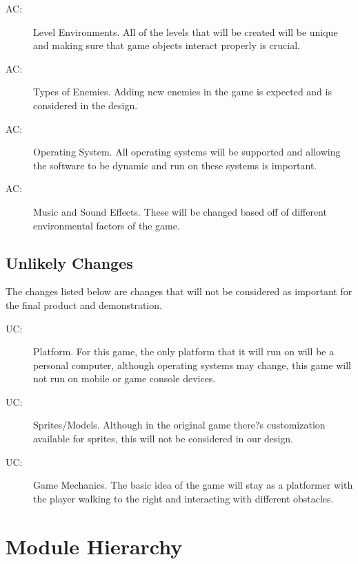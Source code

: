 \documentclass[12pt, titlepage]{article}
\newcounter{acnum}
\newcommand{\actheacnum}{AC\theacnum}
\newcounter{ucnum}
\newcommand{\uctheucnum}{UC\theucnum}
\begin{document}
\begin{description}
\item[ \actheacnum \label{acEnvironments}:] Level Environments. All of the levels that will be created will be unique and making sure that game objects interact properly is crucial.
\item[ \actheacnum \label{acEnemiest}:] Types of Enemies. Adding new enemies in the game is expected and is considered in the design.
\item [ \actheacnum \label{acOperatingSys}:] Operating System. All operating systems will be supported and allowing the software to be dynamic and run on these systems is important.
\item [ \actheacnum \label{acMusic}:] Music and Sound Effects. These will be changed based off of different environmental factors of the game.
\end{description}

\subsection{Unlikely Changes} \label{SecUchange}

The changes listed below are changes that will not be considered as important for the final product and demonstration.

\begin{description}
\item[ \uctheucnum \label{ucPlatform}:] Platform. For this game, the only platform that it will run on will be a personal computer, although operating systems may change, this game will not run on mobile or game console devices.
\item[ \uctheucnum \label{ucSprites}:] Sprites/Models. Although in the original game there?s customization available for sprites, this will not be considered in our design.
\item[ \uctheucnum \label{ucMechanics}:] Game Mechanics. The basic idea of the game will stay as a platformer with the player walking to the right and interacting with different obstacles.
\end{description}

\section{Module Hierarchy} \label{SecMH}
\end{document}
